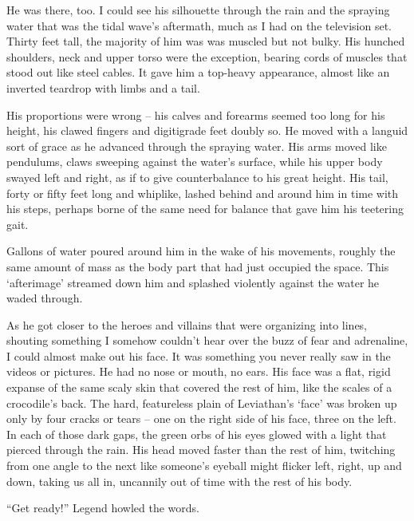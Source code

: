 He was there, too.  I could see his silhouette through the rain and the spraying water that was the tidal wave's aftermath, much as I had on the television set.  Thirty feet tall, the majority of him was was muscled but not bulky.  His hunched shoulders, neck and upper torso were the exception, bearing cords of muscles that stood out like steel cables.  It gave him a top-heavy appearance, almost like an inverted teardrop with limbs and a tail.



His proportions were wrong – his calves and forearms seemed too long for his height, his clawed fingers and digitigrade feet doubly so.  He moved with a languid sort of grace as he advanced through the spraying water.  His arms moved like pendulums, claws sweeping against the water's surface, while his upper body swayed left and right, as if to give counterbalance to his great height.  His tail, forty or fifty feet long and whiplike, lashed behind and around him in time with his steps, perhaps borne of the same need for balance that gave him his teetering gait.



Gallons of water poured around him in the wake of his movements, roughly the same amount of mass as the body part that had just occupied the space.  This `afterimage' streamed down him and splashed violently against the water he waded through.



As he got closer to the heroes and villains that were organizing into lines, shouting something I somehow couldn't hear over the buzz of fear and adrenaline, I could almost make out his face.  It was something you never really saw in the videos or pictures.  He had no nose or mouth, no ears.  His face was a flat, rigid expanse of the same scaly skin that covered the rest of him, like the scales of a crocodile's back.  The hard, featureless plain of Leviathan's `face' was broken up only by four cracks or tears – one on the right side of his face, three on the left.  In each of those dark gaps, the green orbs of his eyes glowed with a light that pierced through the rain.  His head moved faster than the rest of him, twitching from one angle to the next like someone's eyeball might flicker left, right, up and down, taking us all in, uncannily out of time with the rest of his body.



``Get ready!'' Legend howled the words.



